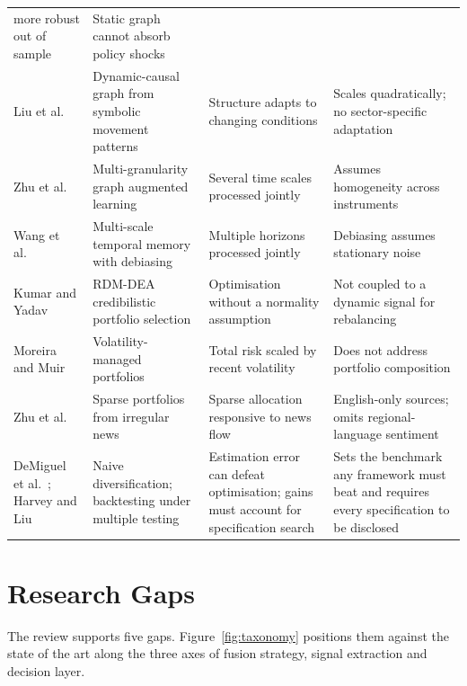 \begin{table}[!htb]
\begin{tabular}{@{}L{2.5cm}L{3.3cm}L{3.9cm}L{4.1cm}@{}}
more robust out of sample & Static graph cannot absorb policy shocks \\
Liu et al.~\cite{liu2026dynamic} & Dynamic-causal graph from symbolic movement patterns &
Structure adapts to changing conditions & Scales quadratically; no sector-specific adaptation \\
Zhu et al.~\cite{zhu2025multigran} & Multi-granularity graph augmented learning & Several time
scales processed jointly & Assumes homogeneity across instruments \\
Wang et al.~\cite{wang2025mtmd} & Multi-scale temporal memory with debiasing & Multiple horizons
processed jointly & Debiasing assumes stationary noise \\
Kumar and Yadav~\cite{kumar2024rdmdea} & RDM-DEA credibilistic portfolio selection &
Optimisation without a normality assumption & Not coupled to a dynamic signal for rebalancing \\
Moreira and Muir~\cite{moreira2017} & Volatility-managed portfolios & Total risk scaled by
recent volatility & Does not address portfolio composition \\
Zhu et al.~\cite{zhu2025spin} & Sparse portfolios from irregular news & Sparse allocation
responsive to news flow & English-only sources; omits regional-language sentiment \\
DeMiguel et al.~\cite{demiguel2009}; Harvey and Liu~\cite{harvey2015} & Naive diversification;
backtesting under multiple testing & Estimation error can defeat optimisation; gains must
account for specification search & Sets the benchmark any framework must beat and requires every
specification to be disclosed \\
\bottomrule
\end{tabular}
\end{table}

\section{Research Gaps}

The review supports five gaps. Figure~\ref{fig:taxonomy} positions them against the state of the
art along the three axes of fusion strategy, signal extraction and decision layer.


